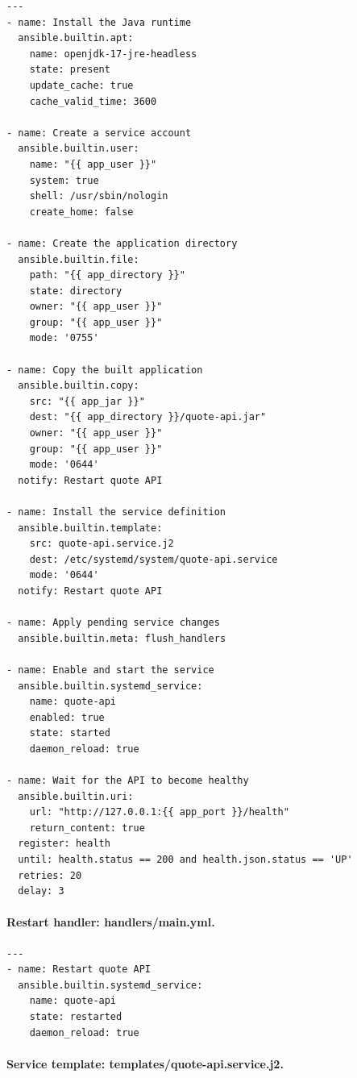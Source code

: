 \documentclass[12pt,a4paper]{article}
\begin{document}
\begin{lstlisting}[language={}]
---
- name: Install the Java runtime
  ansible.builtin.apt:
    name: openjdk-17-jre-headless
    state: present
    update_cache: true
    cache_valid_time: 3600

- name: Create a service account
  ansible.builtin.user:
    name: "{{ app_user }}"
    system: true
    shell: /usr/sbin/nologin
    create_home: false

- name: Create the application directory
  ansible.builtin.file:
    path: "{{ app_directory }}"
    state: directory
    owner: "{{ app_user }}"
    group: "{{ app_user }}"
    mode: '0755'

- name: Copy the built application
  ansible.builtin.copy:
    src: "{{ app_jar }}"
    dest: "{{ app_directory }}/quote-api.jar"
    owner: "{{ app_user }}"
    group: "{{ app_user }}"
    mode: '0644'
  notify: Restart quote API

- name: Install the service definition
  ansible.builtin.template:
    src: quote-api.service.j2
    dest: /etc/systemd/system/quote-api.service
    mode: '0644'
  notify: Restart quote API

- name: Apply pending service changes
  ansible.builtin.meta: flush_handlers

- name: Enable and start the service
  ansible.builtin.systemd_service:
    name: quote-api
    enabled: true
    state: started
    daemon_reload: true

- name: Wait for the API to become healthy
  ansible.builtin.uri:
    url: "http://127.0.0.1:{{ app_port }}/health"
    return_content: true
  register: health
  until: health.status == 200 and health.json.status == 'UP'
  retries: 20
  delay: 3
\end{lstlisting}

\paragraph{Restart handler: handlers/main.yml.}

\begin{lstlisting}[language={}]
---
- name: Restart quote API
  ansible.builtin.systemd_service:
    name: quote-api
    state: restarted
    daemon_reload: true
\end{lstlisting}

\paragraph{Service template: templates/quote-api.service.j2.}
\end{document}
